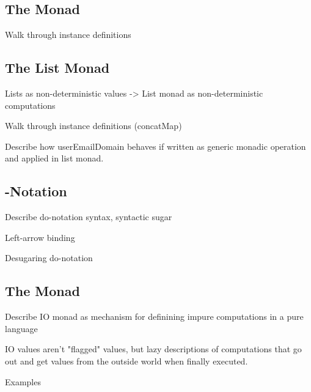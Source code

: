 \subsection{The  Monad}

\begin{notelist}
    \item Walk through instance definitions
\end{notelist}

\subsection{The List Monad}

\begin{notelist}
    \item Lists as non-deterministic values -> List monad as non-deterministic computations
    \item Walk through instance definitions (concatMap)
    \item Describe how userEmailDomain behaves if written as generic monadic operation and applied in list monad.
\end{notelist}

\subsection{-Notation}

\begin{notelist}
    \item Describe do-notation syntax, syntactic sugar
    \item Left-arrow binding
    \item Desugaring do-notation
\end{notelist}

\subsection{The  Monad}

\begin{notelist}
    \item Describe IO monad as mechanism for definining impure computations in a pure language
    \item IO values aren't "flagged" values, but lazy descriptions of computations that go out and get values from
          the outside world when finally executed.
    \item Examples
\end{notelist}


